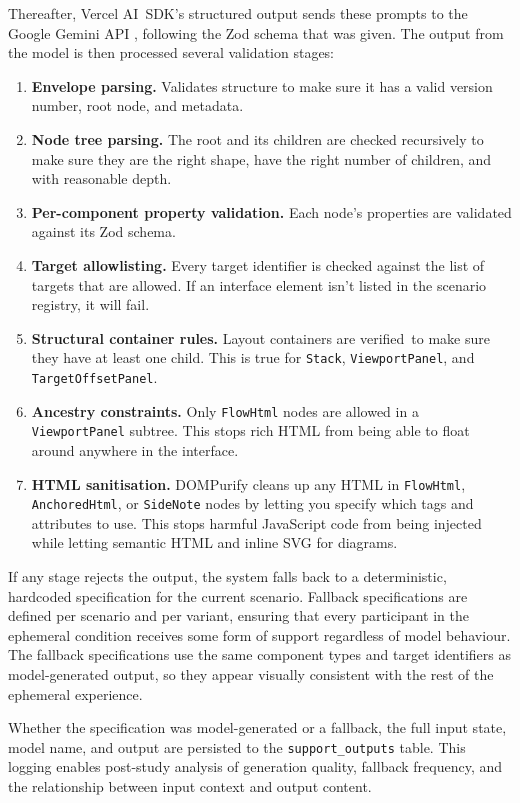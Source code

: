 Thereafter, Vercel AI~SDK's structured output sends these prompts to the Google Gemini API \parencite{GoogleGemini,VercelAISDK}, following the Zod schema that was given. The output from the model is then processed several validation stages:

\begin{enumerate}
    \item \textbf{Envelope parsing.} Validates structure to make sure it has a valid version number, root node, and metadata.
    \item \textbf{Node tree parsing.} The root and its children are checked recursively to make sure they are the right shape, have the right number of children, and with reasonable depth.
    \item \textbf{Per-component property validation.} Each node's properties are validated against its Zod schema.
    \item \textbf{Target allowlisting.} Every target identifier is checked against the list of targets that are allowed. If an interface element isn't listed in the scenario registry, it will fail.
    \item \textbf{Structural container rules.} Layout containers are verified to make sure they have at least one child. This is true for \texttt{Stack}, \texttt{ViewportPanel}, and \texttt{TargetOffsetPanel}.
    \item \textbf{Ancestry constraints.} Only \texttt{FlowHtml} nodes are allowed in a \texttt{ViewportPanel} subtree. This stops rich HTML from being able to float around anywhere in the interface.
    \item \textbf{HTML sanitisation.} DOMPurify cleans up any HTML in \texttt{FlowHtml}, \texttt{AnchoredHtml}, or \texttt{SideNote} nodes by letting you specify which tags and attributes to use. This stops harmful JavaScript code from being injected while letting semantic HTML and inline SVG for diagrams.
\end{enumerate}

If any stage rejects the output, the system falls back to a deterministic, hardcoded specification for the current scenario. Fallback specifications are defined per scenario and per variant, ensuring that every participant in the ephemeral condition receives some form of support regardless of model behaviour. The fallback specifications use the same component types and target identifiers as model-generated output, so they appear visually consistent with the rest of the ephemeral experience.

Whether the specification was model-generated or a fallback, the full input state, model name, and output are persisted to the \texttt{support\_outputs} table. This logging enables post-study analysis of generation quality, fallback frequency, and the relationship between input context and output content.


